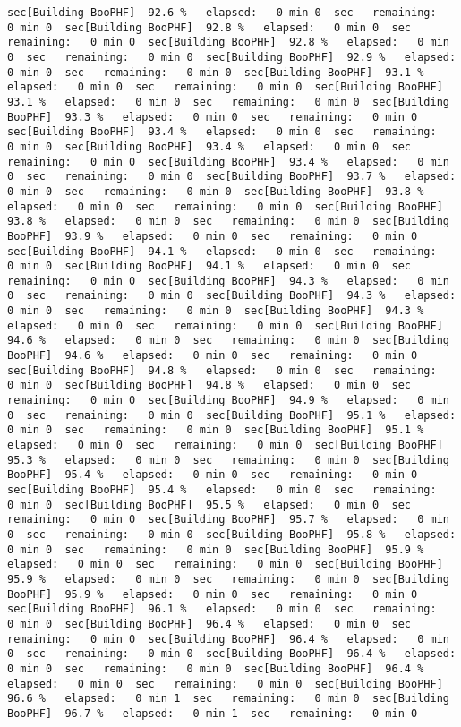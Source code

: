 \documentclass[
]{book}
\begin{document}
\begin{verbatim}
sec[Building BooPHF]  92.6 %   elapsed:   0 min 0  sec   remaining:   0 min 0  sec[Building BooPHF]  92.8 %   elapsed:   0 min 0  sec   remaining:   0 min 0  sec[Building BooPHF]  92.8 %   elapsed:   0 min 0  sec   remaining:   0 min 0  sec[Building BooPHF]  92.9 %   elapsed:   0 min 0  sec   remaining:   0 min 0  sec[Building BooPHF]  93.1 %   elapsed:   0 min 0  sec   remaining:   0 min 0  sec[Building BooPHF]  93.1 %   elapsed:   0 min 0  sec   remaining:   0 min 0  sec[Building BooPHF]  93.3 %   elapsed:   0 min 0  sec   remaining:   0 min 0  sec[Building BooPHF]  93.4 %   elapsed:   0 min 0  sec   remaining:   0 min 0  sec[Building BooPHF]  93.4 %   elapsed:   0 min 0  sec   remaining:   0 min 0  sec[Building BooPHF]  93.4 %   elapsed:   0 min 0  sec   remaining:   0 min 0  sec[Building BooPHF]  93.7 %   elapsed:   0 min 0  sec   remaining:   0 min 0  sec[Building BooPHF]  93.8 %   elapsed:   0 min 0  sec   remaining:   0 min 0  sec[Building BooPHF]  93.8 %   elapsed:   0 min 0  sec   remaining:   0 min 0  sec[Building BooPHF]  93.9 %   elapsed:   0 min 0  sec   remaining:   0 min 0  sec[Building BooPHF]  94.1 %   elapsed:   0 min 0  sec   remaining:   0 min 0  sec[Building BooPHF]  94.1 %   elapsed:   0 min 0  sec   remaining:   0 min 0  sec[Building BooPHF]  94.3 %   elapsed:   0 min 0  sec   remaining:   0 min 0  sec[Building BooPHF]  94.3 %   elapsed:   0 min 0  sec   remaining:   0 min 0  sec[Building BooPHF]  94.3 %   elapsed:   0 min 0  sec   remaining:   0 min 0  sec[Building BooPHF]  94.6 %   elapsed:   0 min 0  sec   remaining:   0 min 0  sec[Building BooPHF]  94.6 %   elapsed:   0 min 0  sec   remaining:   0 min 0  sec[Building BooPHF]  94.8 %   elapsed:   0 min 0  sec   remaining:   0 min 0  sec[Building BooPHF]  94.8 %   elapsed:   0 min 0  sec   remaining:   0 min 0  sec[Building BooPHF]  94.9 %   elapsed:   0 min 0  sec   remaining:   0 min 0  sec[Building BooPHF]  95.1 %   elapsed:   0 min 0  sec   remaining:   0 min 0  sec[Building BooPHF]  95.1 %   elapsed:   0 min 0  sec   remaining:   0 min 0  sec[Building BooPHF]  95.3 %   elapsed:   0 min 0  sec   remaining:   0 min 0  sec[Building BooPHF]  95.4 %   elapsed:   0 min 0  sec   remaining:   0 min 0  sec[Building BooPHF]  95.4 %   elapsed:   0 min 0  sec   remaining:   0 min 0  sec[Building BooPHF]  95.5 %   elapsed:   0 min 0  sec   remaining:   0 min 0  sec[Building BooPHF]  95.7 %   elapsed:   0 min 0  sec   remaining:   0 min 0  sec[Building BooPHF]  95.8 %   elapsed:   0 min 0  sec   remaining:   0 min 0  sec[Building BooPHF]  95.9 %   elapsed:   0 min 0  sec   remaining:   0 min 0  sec[Building BooPHF]  95.9 %   elapsed:   0 min 0  sec   remaining:   0 min 0  sec[Building BooPHF]  95.9 %   elapsed:   0 min 0  sec   remaining:   0 min 0  sec[Building BooPHF]  96.1 %   elapsed:   0 min 0  sec   remaining:   0 min 0  sec[Building BooPHF]  96.4 %   elapsed:   0 min 0  sec   remaining:   0 min 0  sec[Building BooPHF]  96.4 %   elapsed:   0 min 0  sec   remaining:   0 min 0  sec[Building BooPHF]  96.4 %   elapsed:   0 min 0  sec   remaining:   0 min 0  sec[Building BooPHF]  96.4 %   elapsed:   0 min 0  sec   remaining:   0 min 0  sec[Building BooPHF]  96.6 %   elapsed:   0 min 1  sec   remaining:   0 min 0  sec[Building BooPHF]  96.7 %   elapsed:   0 min 1  sec   remaining:   0 min 0  
\end{verbatim}
\end{document}
